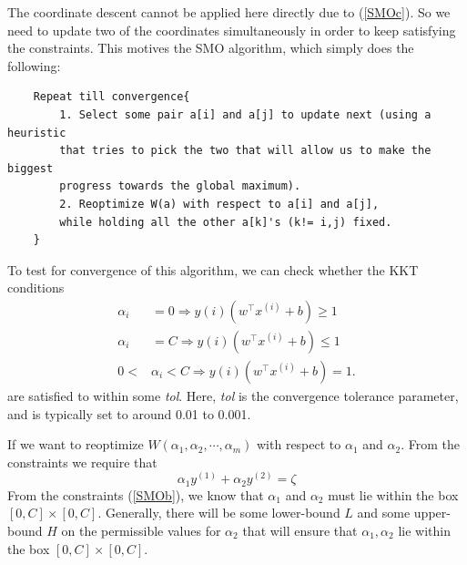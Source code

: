 \documentclass[a4paper]{report}
\begin{document}
The coordinate descent cannot be applied here directly due to (\ref{SMOc}). So we need to update two of the coordinates simultaneously in order to keep satisfying the constraints. This motives the SMO algorithm, which simply does the following:
\begin{verbatim}
    Repeat till convergence{
        1. Select some pair a[i] and a[j] to update next (using a heuristic 
        that tries to pick the two that will allow us to make the biggest 
        progress towards the global maximum).
        2. Reoptimize W(a) with respect to a[i] and a[j], 
        while holding all the other a[k]'s (k!= i,j) fixed.
    }
\end{verbatim}
To test for convergence of this algorithm, we can check whether the KKT
conditions
\begin{align}
	\alpha_i &= 0 \Rightarrow y(i)(w^{\intercal} x^{(i)} + b) \geq 1 \\
	\alpha_i &= C \Rightarrow y(i)(w^{\intercal} x^{(i)} + b) \leq 1 \\
	0 <& \alpha_i < C \Rightarrow y(i)(w^{\intercal} x^{(i)} + b) = 1.
\end{align}
 are satisfied to within some \emph{tol}. Here, \emph{tol} is
the convergence tolerance parameter, and is typically set to around 0.01 to
0.001.

If we want to reoptimize $W(\alpha_1,\alpha_2,\cdots,\alpha_m)$ with respect to $\alpha_1$ and $\alpha_2$. From the constraints we require that 
\begin{equation}
	\alpha_1 y^{(1)} + \alpha_2 y^{(2)} = \zeta
\end{equation}
From the constraints (\ref{SMOb}), we know that $\alpha_1$ and $\alpha_2$ must lie within the box $[0,C] \times [0,C]$. Generally, there will be some lower-bound $L$ and some upper-bound $H$ on the permissible values for $\alpha_2$ that will ensure that $\alpha_1,\alpha_2$ lie within the box $[0,C] \times [0,C]$.
\end{document}
